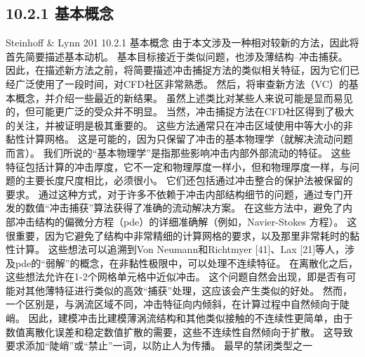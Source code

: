 \documentclass[UTF8,11pt,a4paper,openany,fontset=fandol]{ctexbook}
\begin{document}
\subsection{10.2.1 基本概念}
Steinhoff \& Lynn 201 10.2.1 基本概念 由于本文涉及一种相对较新的方法，因此将首先简要描述基本动机。 基本目标接近于类似问题，也涉及薄结构--冲击捕获。 因此，在描述新方法之前，将简要描述冲击捕捉方法的类似相关特征，因为它们已经广泛使用了一段时间，对CFD社区非常熟悉。 然后，将审查新方法（VC）的基本概念，并介绍一些最近的新结果。 虽然上述类比对某些人来说可能是显而易见的，但可能更广泛的受众并不明显。 当然，冲击捕捉方法在CFD社区得到了极大的关注，并被证明是极其重要的。 这些方法通常只在冲击区域使用中等大小的非黏性计算网格。 这是可能的，因为只保留了冲击的基本物理学（就解决流动问题而言）。 我们所说的“基本物理学”是指那些影响冲击内部外部流动的特征。 这些特征包括计算的冲击厚度，它不一定和物理厚度一样小，但和物理厚度一样，与问题的主要长度尺度相比，必须很小。 它们还包括通过冲击整合的保护法被保留的要求。 通过这种方式，对于许多不依赖于冲击内部结构细节的问题，通过专门开发的数值“冲击捕获”算法获得了准确的流动解决方案。 在这些方法中，避免了内部冲击结构的偏微分方程（pde）的详细准确解（例如，Navier-Stokes 方程）。 这很重要，因为它避免了结构中非常精细的计算网格的要求，以及那里非常耗时的黏性计算。 这些想法可以追溯到Von Neumann和Richtmyer [41]、Lax [21]等人，涉及pde的“弱解”的概念，在非黏性极限中，可以处理不连续特征。 在离散化之后，这些想法允许在1-2个网格单元格中近似冲击。 这个问题自然会出现，即是否有可能对其他薄特征进行类似的高效“捕获”处理，这应该会产生类似的好处。 然而，一个区别是，与涡流区域不同，冲击特征向内倾斜，在计算过程中自然倾向于陡峭。 因此，建模冲击比建模薄涡流结构和其他类似接触的不连续性更简单，由于数值离散化误差和稳定数值扩散的需要，这些不连续性自然倾向于扩散。 这导致要求添加“陡峭”或“禁止”一词，以防止人为传播。 最早的禁闭类型之一
\end{document}
